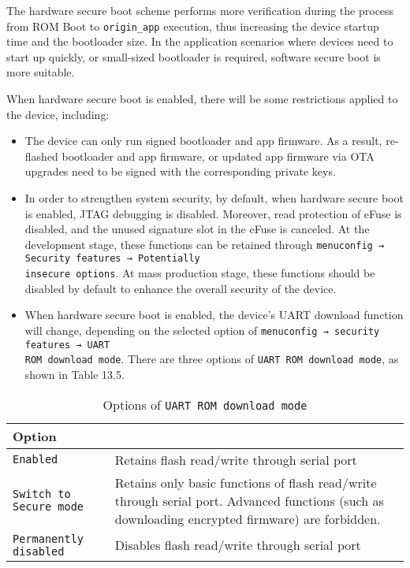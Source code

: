 \documentclass[a4paper,12pt]{book}
\begin{document}
The hardware secure boot scheme performs more verification during the process from ROM Boot to \verb|origin_app| execution, thus increasing the device startup time and the bootloader size. In the application scenarios where devices need to start up quickly, or small-sized bootloader is required, software secure boot is more suitable.

When hardware secure boot is enabled, there will be some restrictions applied to the device, including: 

\begin{itemize}[leftmargin=1.5em]
    \item The device can only run signed bootloader and app firmware. As a result, re-flashed bootloader and app firmware, or updated app firmware via OTA upgrades need to be signed with the corresponding private keys.
    \item In order to strengthen system security, by default, when hardware secure boot is enabled, JTAG debugging is disabled. Moreover, read protection of eFuse is disabled, and the unused signature slot in the eFuse is canceled. At the development stage, these functions can be retained through \verb|menuconfig → Security features → Potentially |\\ \verb|insecure options|. At mass production stage, these functions should be disabled by default to enhance the overall security of the device.
    \item When hardware secure boot is enabled, the device’s UART download function will change, depending on the selected option of \verb|menuconfig → security features → UART|\\ \verb|ROM download mode|. There are three options of \verb|UART ROM download mode|, as shown in Table 13.5.
\end{itemize}

\begin{table}[h!]
    \renewcommand{\arraystretch}{1.4}
    \caption{Options of \texttt{UART ROM download mode}}
    \begin{tabular}{|>{\Centering}m{13em}|>{\RaggedRight}m{25.5em}|}
        \hline
        \rowcolor{LightBlue} \textbf{Option}&\multicolumn{1}{c|}{\textbf{Description}}\\
        \hline
        \verb|Enabled|&Retains flash read/write through serial port\\
        \hline
        \verb|Switch to Secure mode|&Retains only basic functions of flash read/write through serial port. Advanced functions (such as downloading encrypted firmware) are forbidden.\\
        \hline
        \verb|Permanently disabled|&Disables flash read/write through serial port\\
        \hline
    \end{tabular}
\end{table}
\end{document}
